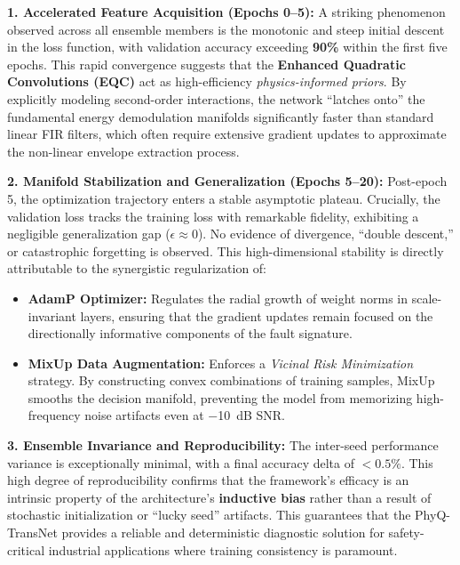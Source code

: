 \documentclass[5p,times,twocolumn]{elsarticle}
\begin{document}
\textbf{1. Accelerated Feature Acquisition (Epochs 0--5):}
A striking phenomenon observed across all ensemble members is the monotonic and steep initial descent in the loss function, with validation accuracy exceeding \textbf{90\%} within the first five epochs. This rapid convergence suggests that the \textbf{Enhanced Quadratic Convolutions (EQC)} act as high-efficiency \textit{physics-informed priors}. By explicitly modeling second-order interactions, the network ``latches onto'' the fundamental energy demodulation manifolds significantly faster than standard linear FIR filters, which often require extensive gradient updates to approximate the non-linear envelope extraction process.

\textbf{2. Manifold Stabilization and Generalization (Epochs 5--20):}
Post-epoch 5, the optimization trajectory enters a stable asymptotic plateau. Crucially, the validation loss tracks the training loss with remarkable fidelity, exhibiting a negligible generalization gap ($\epsilon \approx 0$). No evidence of divergence, ``double descent,'' or catastrophic forgetting is observed. This high-dimensional stability is directly attributable to the synergistic regularization of:
\begin{itemize}
    \item \textbf{AdamP Optimizer:} Regulates the radial growth of weight norms in scale-invariant layers, ensuring that the gradient updates remain focused on the directionally informative components of the fault signature.
    \item \textbf{MixUp Data Augmentation:} Enforces a \textit{Vicinal Risk Minimization} strategy. By constructing convex combinations of training samples, MixUp smooths the decision manifold, preventing the model from memorizing high-frequency noise artifacts even at \SI{-10}{dB} SNR.
\end{itemize}

\textbf{3. Ensemble Invariance and Reproducibility:}
The inter-seed performance variance is exceptionally minimal, with a final accuracy delta of \textbf{$<0.5\%$}. This high degree of reproducibility confirms that the framework's efficacy is an intrinsic property of the architecture's \textbf{inductive bias} rather than a result of stochastic initialization or ``lucky seed'' artifacts. This guarantees that the PhyQ-TransNet provides a reliable and deterministic diagnostic solution for safety-critical industrial applications where training consistency is paramount.
\end{document}
